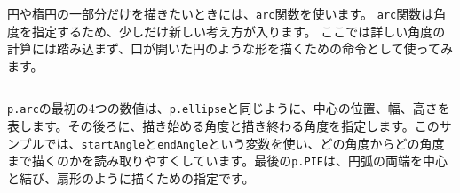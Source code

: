 円や楕円の一部分だけを描きたいときには、\texttt{arc}関数を使います。
\texttt{arc}関数は角度を指定するため、少しだけ新しい考え方が入ります。
ここでは詳しい角度の計算には踏み込まず、口が開いた円のような形を描くための命令として使ってみます。

\begin{listing}[htbp]
\inputminted{ts}{typescript-p5/listings/chapter04/arc-pacman.ts}
\caption{arcで口が開いた円を描く（\texttt{chapter04/arc-pacman.ts}）}
\label{lst:chapter04-arc-pacman}
\end{listing}

\texttt{p.arc}の最初の4つの数値は、\texttt{p.ellipse}と同じように、中心の位置、幅、高さを表します。その後ろに、描き始める角度と描き終わる角度を指定します。このサンプルでは、\texttt{startAngle}と\texttt{endAngle}という変数を使い、どの角度からどの角度まで描くのかを読み取りやすくしています。最後の\texttt{p.PIE}は、円弧の両端を中心と結び、扇形のように描くための指定です。

